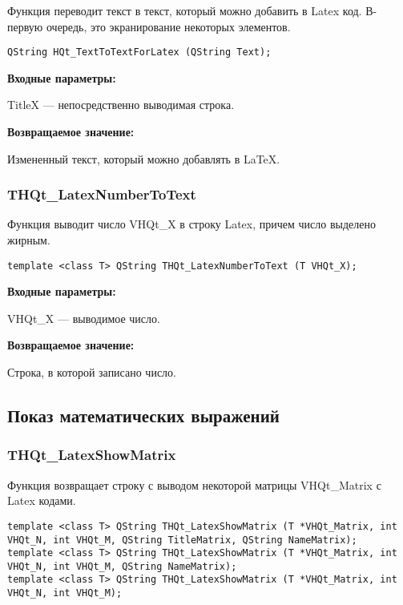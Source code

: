 \documentclass[a4paper,12pt]{article}
\begin{document}
Функция переводит текст в текст, который можно добавить в Latex код. В-первую очередь, это экранирование некоторых элементов.


\begin{lstlisting}[label=code_syntax_HQt_TextToTextForLatex,caption=Синтаксис]
QString HQt_TextToTextForLatex (QString Text);
\end{lstlisting}

\textbf{Входные параметры:}

TitleX --- непосредственно выводимая строка.

\textbf{Возвращаемое значение:}

Измененный текст, который можно добавлять в LaTeX.


\subsubsection{THQt\_LatexNumberToText}\label{THQt_LatexNumberToText}

Функция выводит число VHQt\_X в строку Latex, причем число выделено жирным.


\begin{lstlisting}[label=code_syntax_THQt_LatexNumberToText,caption=Синтаксис]
template <class T> QString THQt_LatexNumberToText (T VHQt_X);
\end{lstlisting}

\textbf{Входные параметры:}

VHQt\_X --- выводимое число.

\textbf{Возвращаемое значение:}

Строка, в которой записано число.


\subsection{Показ математических выражений}

\subsubsection{THQt\_LatexShowMatrix}\label{THQt_LatexShowMatrix}

Функция возвращает строку с выводом некоторой матрицы VHQt\_Matrix с Latex кодами.


\begin{lstlisting}[label=code_syntax_THQt_LatexShowMatrix,caption=Синтаксис]
template <class T> QString THQt_LatexShowMatrix (T *VHQt_Matrix, int VHQt_N, int VHQt_M, QString TitleMatrix, QString NameMatrix);
template <class T> QString THQt_LatexShowMatrix (T *VHQt_Matrix, int VHQt_N, int VHQt_M, QString NameMatrix);
template <class T> QString THQt_LatexShowMatrix (T *VHQt_Matrix, int VHQt_N, int VHQt_M);
\end{lstlisting}
\end{document}
